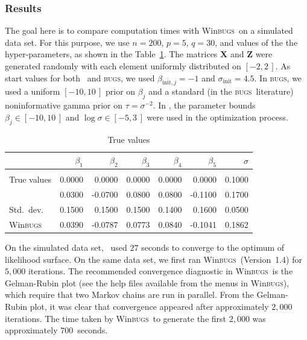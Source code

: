 \documentclass{admbmanual}
\newcommand{\scBUGS}{\textsc{bugs}}
\newcommand{\scWinBUGS}{Win\textsc{bugs}}
\begin{document}
\subsubsection{Results}

The goal here is to compare computation times with \scWinBUGS\ on a simulated data set.
For this purpose, we use $n=200$, $p=5$, $q=30$, and values of the the hyper-parameters, as shown in the Table~\ref{tab:true-values}. The matrices
$\mathbf{X}$ and $\mathbf{Z}$ were generated randomly with each element
uniformly distributed on $[-2,2\,]$. As start values for both \ADM\ and
\scBUGS, we used $\beta _{\mathrm{init},j}=-1$ and $\sigma_\mathrm{init}=4.5$. In
\scBUGS, we used a uniform $[-10,10\,]$ prior on $\beta_j$ and a standard (in the \scBUGS\
literature) noninformative gamma prior on $\tau=\sigma^{-2}$. In \ADM, the parameter bounds $\beta_j\in[-10,10\,]$ and $\log\sigma\in[-5,3\,]$ were
used in the optimization process.
\begin{table}[h]
\begin{center}
  \begin{tabular}{@{\vrule height 12pt depth 6pt width0pt} lrrrrrr}
    \hline
    ~           & $\beta_1$ & $\beta_2$ & $\beta_3$ & $\beta_4$ & $\beta_5$ & $\sigma$\\
    \hline\\[-16pt]
    True values & 0.0000    &  0.0000   & 0.0000    & 0.0000    &  0.0000   & 0.1000  \\
    \scAR\     & 0.0300    & -0.0700   & 0.0800    & 0.0800    & -0.1100   & 0.1700  \\
    Std.\ dev.  & 0.1500    &  0.1500   & 0.1500    & 0.1400    &  0.1600   & 0.0500  \\
    \scWinBUGS\     & 0.0390    & -0.0787   & 0.0773    & 0.0840    & -0.1041   & 0.1862  \\
    \hline
  \end{tabular}
\end{center}
\caption{True values}
\label{tab:true-values}
\end{table}
%
On the simulated data set, \ADM\ used $27$ seconds to converge to the
optimum of likelihood surface. On the same data set, we first ran \scWinBUGS\ (Version~1.4) for $5,000$ iterations. The recommended convergence diagnostic in \scWinBUGS\
is the Gelman-Rubin plot (see the help files available from the menus in
\scWinBUGS), which require that two Markov chains are run in parallel. From the
Gelman-Rubin plot, it was clear that convergence appeared after approximately
$2,000$ iterations. The time taken by \scWinBUGS\ to generate the first
$2,000$ was approximately $700$~seconds.
\end{document}

